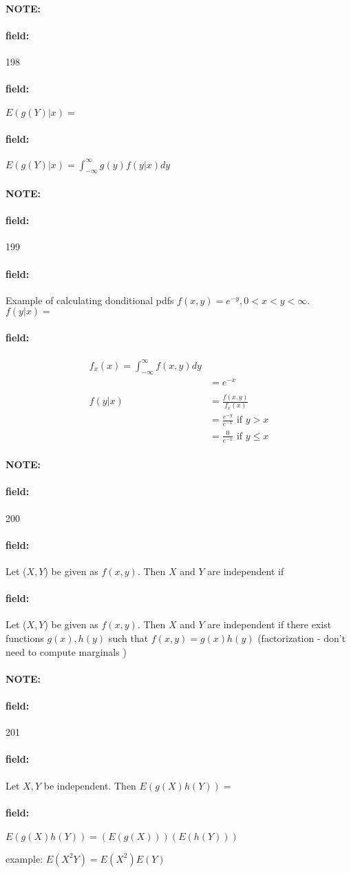 \documentclass[12pt]{article}
\newenvironment{note}{\paragraph{NOTE:}}{}
\newenvironment{field}{\paragraph{field:}}{}
\begin{document}
\begin{note} \begin{field} \tiny 198 \end{field}
  \begin{field}
    $E(g(Y)|x) = $
  \end{field}
  \begin{field}
    $E(g(Y)|x) = \int_{-\infty}^\infty g(y)f(y|x) dy $
  \end{field}
\end{note}

\begin{note} \begin{field} \tiny 199 \end{field}
  \begin{field}
    Example of calculating donditional pdfs
$f(x,y) = e^{-y}, 0 < x < y < \infty$. $f(y|x) = $

  \end{field}
  \begin{field}
    \begin{align*}
      f_x(x) = \int_{-\infty}^\infty f(x,y) dy \\
      &= e^{-x}\\
      \\
      f(y|x) &= \frac{f(x,y)}{f_x(x)}\\
      &= \frac{e^{-y}}{e^{-x}} \text{ if } y > x\\
      &= \frac{0}{e^{-x}} \text{ if } y \leq x
    \end{align*}
  \end{field}
\end{note}


\begin{note} \begin{field} \tiny 200 \end{field}
  \begin{field}
    Let ($X,Y$) be given as $f(x,y)$. Then $X$ and $Y$ are independent if
  \end{field}
  \begin{field}
    Let ($X,Y$) be given as $f(x,y)$. Then $X$ and $Y$ are independent if there exist functions $g(x), h(y)$ such that $f(x,y) = g(x)h(y)$ (factorization - don't need to compute marginals )
  \end{field}
\end{note}

\begin{note} \begin{field} \tiny 201 \end{field}
  \begin{field}
    Let $X,Y$ be independent. Then $E(g(X)h(Y)) = $
  \end{field}
  \begin{field}
    $E(g(X)h(Y)) = (E(g(X)))(E(h(Y)))$

    example: $E(X^2Y) = E(X^2)E(Y)$
  \end{field}
\end{note}
\end{document}
